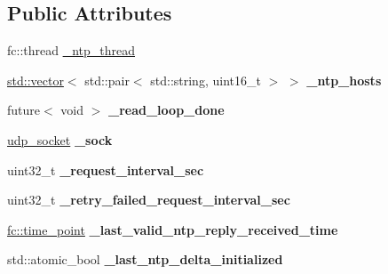 \subsection*{Public Attributes}
\begin{DoxyCompactItemize}
\item 
fc\+::thread \mbox{\hyperlink{classfc_1_1detail_1_1ntp__impl_ad6bd75c34d45ab832c5bf5ab7aab0cca}{\+\_\+ntp\+\_\+thread}}
\item 
\mbox{\label{classfc_1_1detail_1_1ntp__impl_a492fb7af84f8442b90b4f73901adbe61}} 
\mbox{\hyperlink{classstd_1_1vector}{std\+::vector}}$<$ std\+::pair$<$ std\+::string, uint16\+\_\+t $>$ $>$ {\bfseries \+\_\+ntp\+\_\+hosts}
\item 
\mbox{\label{classfc_1_1detail_1_1ntp__impl_a75bfd3d5ce6037a7bfae89da0a9f73ba}} 
future$<$ void $>$ {\bfseries \+\_\+read\+\_\+loop\+\_\+done}
\item 
\mbox{\label{classfc_1_1detail_1_1ntp__impl_a3192be9a4c6cb1b17c692a0e1d7ef61c}} 
\mbox{\hyperlink{classfc_1_1udp__socket}{udp\+\_\+socket}} {\bfseries \+\_\+sock}
\item 
\mbox{\label{classfc_1_1detail_1_1ntp__impl_a0154039055094fd24c5f156b4252cc6b}} 
uint32\+\_\+t {\bfseries \+\_\+request\+\_\+interval\+\_\+sec}
\item 
\mbox{\label{classfc_1_1detail_1_1ntp__impl_aab50f7060faf962cfc6967d4089f0381}} 
uint32\+\_\+t {\bfseries \+\_\+retry\+\_\+failed\+\_\+request\+\_\+interval\+\_\+sec}
\item 
\mbox{\label{classfc_1_1detail_1_1ntp__impl_a4f00346f22b4b815bf4c3c6cdb9ab3ed}} 
\mbox{\hyperlink{classfc_1_1time__point}{fc\+::time\+\_\+point}} {\bfseries \+\_\+last\+\_\+valid\+\_\+ntp\+\_\+reply\+\_\+received\+\_\+time}
\item 
\mbox{\label{classfc_1_1detail_1_1ntp__impl_a6e0753611dff46a52e93a1d5a0566347}} 
std\+::atomic\+\_\+bool {\bfseries \+\_\+last\+\_\+ntp\+\_\+delta\+\_\+initialized}
\item 
\mbox{\label{classfc_1_1detail_1_1ntp__impl_a0fb88b0eac88e8a384236d3e54f8e71c}} 

\end{DoxyCompactItemize}
